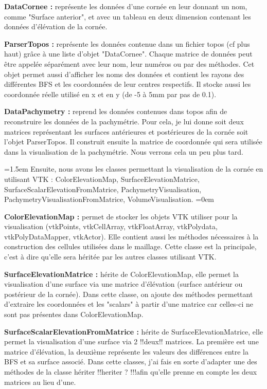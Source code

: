 \documentclass[a4paper,12pt]{article}
\begin{document}
\textbf{DataCornee : }
représente les données d'une cornée en leur donnant un nom, comme "Surface anterior", et avec un tableau en deux dimension contenant les données d'élévation de la cornée. 

\textbf{ParserTopos : }
représente les données contenue dans un fichier topos (cf plus haut) grâce à une liste d'objet "DataCornee". Chaque matrice de données peut être appelée séparément avec leur nom, leur numéros ou par des méthodes. Cet objet permet aussi d'afficher les noms des données et contient les rayons des différentes BFS et les coordonnées de leur centres respectifs. Il stocke aussi les coordonnée réelle utilisé en x et en y (de -5 à 5mm par pas de 0.1). 

\textbf{DataPachymetry : } 
reprend les données contenues dans topos afin de reconstruire les données de la pachymétrie. Pour cela, je lui donne soit deux matrices représentant les surfaces antérieures et postérieures de la cornée soit l'objet ParserTopos. Il construit ensuite la matrice de coordonnée qui sera utilisée dans la visualisation de la pachymétrie. Nous verrons cela un peu plus tard.

\vspace{0.25cm}
\parindent=1.5em
Ensuite, nous avons les classes permettant la visualisation de la cornée en utilisant VTK : ColorElevationMap, SurfaceElevationMatrice, SurfaceScalarElevationFromMatrice, PachymetryVisualisation, PachymetryVisualisationFromMatrice, VolumeVisualisation.
\parindent=0em

\textbf{ColorElevationMap : }
permet de stocker les objets VTK utiliser pour la visualisation (vtkPoints, vtkCellArray, vtkFloatArray, vtkPolydata, vtkPolyDataMapper, vtkActor). Elle contient aussi les méthodes nécessaires à la construction des cellules utilisées dans le maillage. Cette classe est la principale, c'est à dire qu'elle sera héritée par les autres classes utilisant VTK.

\textbf{SurfaceElevationMatrice : }
hérite de ColorElevationMap, elle permet la visualisation d'une surface via une matrice d'élévation (surface antérieur ou postérieur de la cornée). Dans cette classe, on ajoute des méthodes permettant d'extraire les coordonnées et les "scalars" à partir d'une matrice car celles-ci ne sont pas présentes dans ColorElevationMap.

\textbf{SurfaceScalarElevationFromMatrice : }
hérite de SurfaceElevationMatrice, elle permet la visualisation d'une surface via 2 !!deux!! matrices. La première est une matrice d'élévation, la deuxième représente les valeurs des différences entre la BFS et sa surface associé. Dans cette classes, j'ai fais en sorte d'adapter une des méthodes de la classe hériter !!heriter ? !!!afin qu'elle prenne en compte les deux matrices au lieu d'une.
\end{document}
